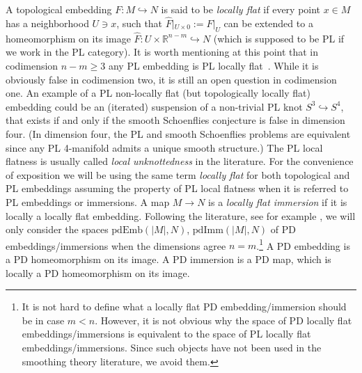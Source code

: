 \documentclass[11pt]{amsart}
\theoremstyle{definition}
\newcommand{\R}{{\mathbb R}}
\newcommand{\pdImm}{\mathrm{pdImm}}
\newcommand{\pdEmb}{\mathrm{pdEmb}}
\numberwithin{equation}{section}
\begin{document}
A topological embedding $F\colon M\hookrightarrow N$ is said to be {\it locally flat} if every point $x\in M$ has 
a neighborhood $U\ni x$, such that  $\hat F|_{U\times 0}:=F|_U$ can be extended to a homeomorphism on its image $\hat F\colon U\times \R^{n-m}\hookrightarrow N$ (which is supposed to be PL if we
work in the PL category).  It is worth mentioning at this point that in codimension $n-m\geq 3$ any PL embedding is PL locally flat~\cite{Zeeman}.  While it is
obviously false in codimension two, it is still an open question in codimension one. An example of a PL non-locally flat (but topologically locally flat) embedding could be an (iterated) suspension 
of a non-trivial PL knot $S^3\hookrightarrow S^4$, that exists if and only if the smooth Schoenflies  conjecture is false in dimension four. (In dimension four, the PL and smooth Schoenflies problems are equivalent
since any PL 4-manifold admits a unique smooth structure.)  The PL local flatness is usually called {\it local unknottedness} in the literature. For the convenience of exposition we will be using the same term {\it locally flat} for both topological and PL embeddings assuming the property of PL local flatness when it is referred to  PL embeddings or immersions.
A map $M\to N$ is a {\it locally flat immersion} if it is  locally a locally flat embedding.
Following the literature, see for example \cite{BL_diff},
we will only consider the spaces $\pdEmb(|M|,N)$, $\pdImm(|M|,N)$ of PD embeddings/immersions when the dimensions agree $n=m$.\footnote{It is
not hard to define what a locally flat PD embedding/immersion should be in case $m<n$. However, it is not obvious why the space of PD locally flat
 embeddings/immersions is equivalent
to the space of PL locally flat embeddings/immersions. Since such objects have not been used in the smoothing theory literature, we  avoid them.}
 A PD embedding is a 
PD homeomorphism on its image. A PD immersion is a PD map, which is locally a PD homeomorphism on its image.
\end{document}
